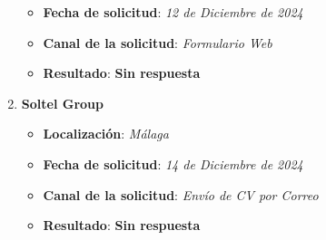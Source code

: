 \begin{enumerate}
\begin{itemize}
		\item \textbf{Fecha de solicitud}: \textit{12 de Diciembre de 2024}
		\item \textbf{Canal de la solicitud}: \textit{Formulario Web}
		\item \textbf{Resultado}: {\color{orange} \textbf{Sin respuesta}}
	\end{itemize}
	 \item \textbf{Soltel Group}
	\begin{itemize}
		\item \textbf{Localización}: \textit{Málaga}
		\item \textbf{Fecha de solicitud}: \textit{14 de Diciembre de 2024}
		\item \textbf{Canal de la solicitud}: \textit{Envío de CV por Correo}
		\item \textbf{Resultado}: {\color{orange} \textbf{Sin respuesta}}
	\end{itemize}
\end{enumerate}







%


